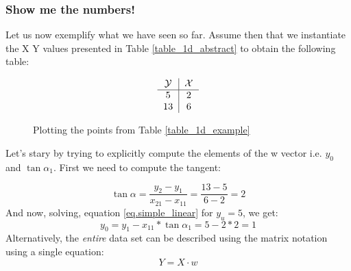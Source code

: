 \subsubsection{Show me the numbers!}
Let us now exemplify what we have seen so far. Assume then that we instantiate the X Y values presented in Table \ref{table_1d_abstract} to obtain the following table:

\begin{align}
\begin{tabular}{c|c}
$\mathcal{Y}$ & $\mathcal{X}$ \\
\hline
5 & 2\\
13 & 6\\
\end{tabular}
\label{table_1d_example}
\end{align}
\begin {figure}[H]
\begin{center}
  
\end{center}
\caption{Plotting the points from Table \ref{table_1d_example}}
\label{fig.simple_line_with_values}
\end {figure}

Let's stary by trying to explicitly compute the elements of the w vector i.e. $y_0$ and $\tan \alpha_1$. First we need to compute the tangent:

\begin{equation}
\tan\alpha = \frac{y_2 - y_1}{x_{21} - x_{11}} = \frac{13 - 5}{6 - 2} = 2
\end{equation}
And now, solving, equation \ref{eq.simple_linear} for $y_u = 5$, we get:
\begin{equation}
y_0 = y_1 - x_{11} * \tan\alpha_1 = 5 - 2 * 2 = 1
\end{equation}
Alternatively, the \emph{entire} data set can be described using the matrix notation using a single equation:
\begin{equation}
Y = X \cdot w
\end{equation}

